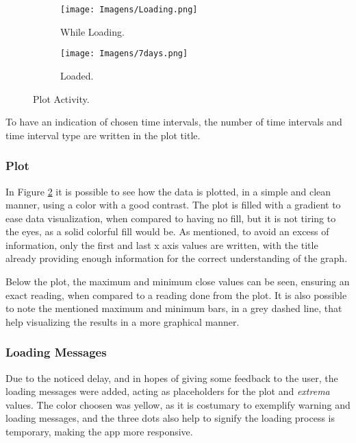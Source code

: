 \documentclass{article}
\begin{document}
\begin{figure}[ht]
    \centering
    
    \begin{subfigure}[t]{0.49\textwidth}
        \centering
        \texttt{[image: Imagens/Loading.png]}
        \caption{While Loading.}
        \label{fig:loading}
    \end{subfigure}
    \hfill
    \begin{subfigure}[t]{0.49\textwidth}
        \centering
        \texttt{[image: Imagens/7days.png]}
        \caption{Loaded.}
        \label{fig:plot loaded}
    \end{subfigure}

    \caption{Plot Activity.}
    \label{fig:plot activity}
\end{figure}

To have an indication of chosen time intervals, the number of time intervals and time interval type are written in the plot title.

\subsubsection{Plot}
In Figure \ref{fig:plot loaded} it is possible to see how the data is plotted, in a simple and clean manner, using a color with a good contrast.
The plot is filled with a gradient to ease data visualization, when compared to having no fill, but it is not tiring to the eyes, as a solid colorful fill would be.
As mentioned, to avoid an excess of information, only the first and last x axis values are written, with the title already providing enough information for the correct understanding of the graph.

Below the plot, the maximum and minimum close values can be seen, ensuring an exact reading, when compared to a reading done from the plot.
It is also possible to note the mentioned maximum and minimum bars, in a grey dashed line, that help visualizing the results in a more graphical manner.


\subsubsection{Loading Messages}
Due to the noticed delay, and in hopes of giving some feedback to the user, the loading messages were added, acting as placeholders for the plot and \textit{extrema} values.
The color choosen was yellow, as it is costumary to exemplify warning and loading messages, and the three dots also help to signify the loading process is temporary, making the app more responsive.
\end{document}
